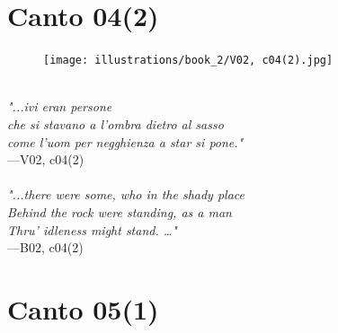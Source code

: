 \documentclass[../Dore_vision.tex]{subfiles}
\begin{document}
\newpage

\section{Canto 04(2)}

\begin{figure}[ht]
\centering
\texttt{[image: illustrations/book\_2/V02, c04(2).jpg]}
\end{figure}

\begin{center}
\begin{minipage}{0.8\linewidth}
\textit{\\
"...ivi eran persone\\che si stavano a l’ombra dietro al sasso\\come l’uom per negghienza a star si pone."} \\
—V02, c04(2) \\~\\
\textit{"...there were some, who in the shady place\\Behind the rock were standing, as a man\\Thru' idleness might stand. …"} \\
—B02, c04(2)
\end{minipage}
\end{center}

\newpage

\section{Canto 05(1)}
\end{document}
